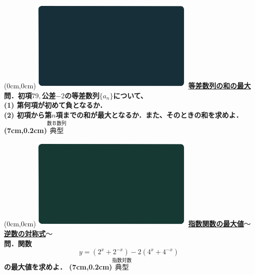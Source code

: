 \documentclass[10pt,
fleqn,
dvipdfmx,
uplatex
]{jsarticle}
\begin{document}
\newpage

\at(0cm,0cm){\includegraphics[width=8cm,bb=0 0 1920 1080]{./youtube/thumbnails/templates/smart_background/数B数列.jpeg}}
{\color{orange}\bf\boldmath\Large\underline{等差数列の和の最大}}\vspace{0.3zw}\\
\large 
\bf\boldmath 問．初項${79},$公差$-2$の等差数列$\{a_n\}$について、\\
(1)  第何項が初めて負となるか．\\
(2)  初項から第$n$項までの和が最大となるか．また、そのときの和を求めよ．\\

\at(7cm,0.2cm){\small\color{bradorange}$\overset{\text{数Ｂ数列}}{\text{典型}}$}

\newpage



\at(0cm,0cm){\includegraphics[width=8cm,bb=0 0 1920 1080]{./youtube/thumbnails/templates/smart_background/指数対数.jpeg}}
{\color{orange}\bf\boldmath\large\underline{指数関数の最大値$〜$逆数の対称式$〜$}}\vspace{0.3zw}\\
\LARGE 
\bf\boldmath 問．関数
\Large
\[ y=\left(2^x+2^{-x}\right)-2\left(4^x+4^{-x}\right)\]
\LARGE
の最大値を求めよ．
\at(7cm,0.2cm){\small\color{bradorange}$\overset{\text{指数対数}}{\text{典型}}$}

\newpage
\end{document}
